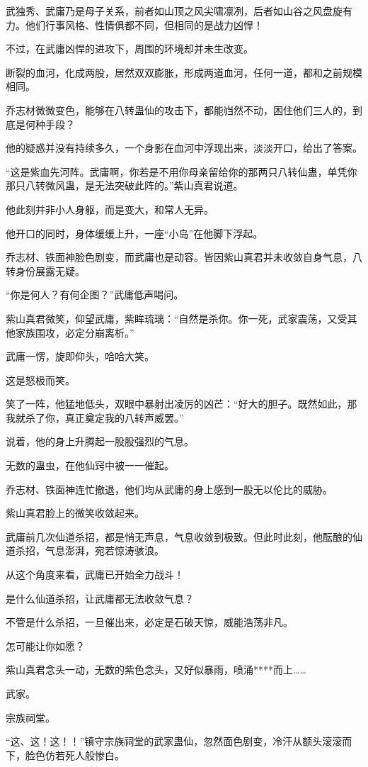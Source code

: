 \begin{this_body}
武独秀、武庸乃是母子关系，前者如山顶之风尖啸凛冽，后者如山谷之风盘旋有力。他们行事风格、性情俱都不同，但相同的是战力凶悍！

不过，在武庸凶悍的进攻下，周围的环境却并未生改变。

断裂的血河，化成两股，居然双双膨胀，形成两道血河，任何一道，都和之前规模相同。

乔志材微微变色，能够在八转蛊仙的攻击下，都能岿然不动，困住他们三人的，到底是何种手段？

他的疑惑并没有持续多久，一个身影在血河中浮现出来，淡淡开口，给出了答案。

“这是紫血先河阵。武庸啊，你若是不用你母亲留给你的那两只八转仙蛊，单凭你那只八转微风蛊，是无法突破此阵的。”紫山真君说道。

他此刻并非小人身躯，而是变大，和常人无异。

他开口的同时，身体缓缓上升，一座“小岛”在他脚下浮起。

乔志材、铁面神脸色剧变，而武庸也是动容。皆因紫山真君并未收敛自身气息，八转身份展露无疑。

“你是何人？有何企图？”武庸低声喝问。

紫山真君微笑，仰望武庸，紫眸琉璃：“自然是杀你。你一死，武家震荡，又受其他家族围攻，必定分崩离析。”

武庸一愣，旋即仰头，哈哈大笑。

这是怒极而笑。

笑了一阵，他猛地低头，双眼中暴射出凌厉的凶芒：“好大的胆子。既然如此，那我就杀了你，真正奠定我的八转声威罢。”

说着，他的身上升腾起一股股强烈的气息。

无数的蛊虫，在他仙窍中被一一催起。

乔志材、铁面神连忙撤退，他们均从武庸的身上感到一股无以伦比的威胁。

紫山真君脸上的微笑收敛起来。

武庸前几次仙道杀招，都是悄无声息，气息收敛到极致。但此时此刻，他酝酿的仙道杀招，气息澎湃，宛若惊涛骇浪。

从这个角度来看，武庸已开始全力战斗！

是什么仙道杀招，让武庸都无法收敛气息？

不管是什么杀招，一旦催出来，必定是石破天惊，威能浩荡非凡。

怎可能让你如愿？

紫山真君念头一动，无数的紫色念头，又好似暴雨，喷涌****而上……

武家。

宗族祠堂。

“这、这！这！！”镇守宗族祠堂的武家蛊仙，忽然面色剧变，冷汗从额头滚滚而下，脸色仿若死人般惨白。


\end{this_body}
